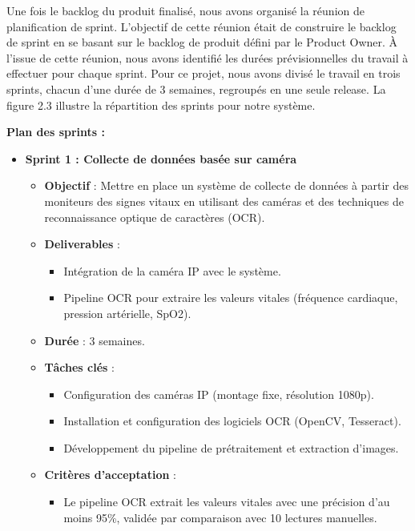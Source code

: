 
Une fois le backlog du produit finalisé, nous avons organisé la réunion de planification de sprint. L'objectif de cette réunion était de construire le backlog de sprint en se basant sur le backlog de produit défini par le Product Owner. À l'issue de cette réunion, nous avons identifié les durées prévisionnelles du travail à effectuer pour chaque sprint. Pour ce projet, nous avons divisé le travail en trois sprints, chacun d'une durée de 3 semaines, regroupés en une seule release. La figure 2.3 illustre la répartition des sprints pour notre système.

\medskip

\textbf{Plan des sprints :}

\begin{itemize}
    \item \textbf{Sprint 1 : Collecte de données basée sur caméra}
    \begin{itemize}
        \item \textbf{Objectif} : Mettre en place un système de collecte de données à partir des moniteurs des signes vitaux en utilisant des caméras et des techniques de reconnaissance optique de caractères (OCR).
        \item \textbf{Deliverables} :
            \begin{itemize}
                \item Intégration de la caméra IP avec le système.
                \item Pipeline OCR pour extraire les valeurs vitales (fréquence cardiaque, pression artérielle, SpO2).
            \end{itemize}
        \item \textbf{Durée} : 3 semaines.
        \item \textbf{Tâches clés} :
            \begin{itemize}
                \item Configuration des caméras IP (montage fixe, résolution 1080p).
                \item Installation et configuration des logiciels OCR (OpenCV, Tesseract).
                \item Développement du pipeline de prétraitement et extraction d'images.
            \end{itemize}
        \item \textbf{Critères d'acceptation} :
            \begin{itemize}
                \item Le pipeline OCR extrait les valeurs vitales avec une précision d'au moins 95\%, validée par comparaison avec 10 lectures manuelles.

\end{itemize}
\end{itemize}
\end{itemize}
